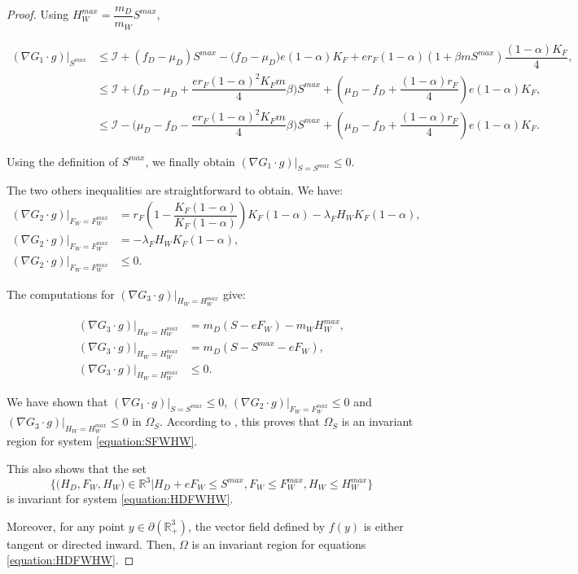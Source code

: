 \documentclass{article}
\newcommand{\lfw}{\lambda_{F}}
\newcommand{\lfw}{\lambda_{F}}
\newcommand{\cI}{\mathcal{I}}
\theoremstyle{definition}
\theoremstyle{remark}
\begin{document}
\begin{proof}
Using $H_W^{max} = \dfrac{m_D}{m_W}S^{max}$,

\begin{align*}
(\nabla G_1 \cdot g)|_{S^{max}} &\leq \cI + (f_D - \mu_D) S^{max} - \Big(f_D - \mu_D \Big) e(1-\alpha)K_F +  er_F (1-\alpha)(1+\beta m S^{max}) \dfrac{(1-\alpha)K_F}{4}, \\
& \leq \cI + \Big(f_D - \mu_D + \dfrac{er_F (1-\alpha)^2K_F m}{4} \beta\Big) S^{max} + \left( \mu_D - f_D   +  \dfrac{(1-\alpha)r_F}{4}\right)e(1-\alpha)K_F, \\
& \leq \cI - \Big(\mu_D -f_D - \dfrac{er_F (1-\alpha)^2K_F m}{4} \beta\Big) S^{max} + \left( \mu_D - f_D   +  \dfrac{(1-\alpha)r_F}{4}\right)e(1-\alpha)K_F.
\end{align*}

Using the definition of $S^{max}$, we finally obtain $(\nabla G_1 \cdot g)|_{S = S^{max}} \leq 0$. 

The two others inequalities are straightforward to obtain. We have:
\begin{align*}
(\nabla G_2 \cdot g)|_{F_W = F_W^{max}} &= r_F  \left(1 - \dfrac{K_F (1-\alpha)}{K_F (1-\alpha)}\right)K_F (1-\alpha)  - \lfw H_W K_F (1-\alpha), \\
(\nabla G_2 \cdot g)|_{F_W = F_W^{max}} & = - \lfw H_W K_F (1-\alpha), \\
(\nabla G_2 \cdot g)|_{F_W = F_W^{max}} & \leq 0.
\end{align*}

The computations for $(\nabla G_3 \cdot g)|_{H_W = H_W^{max}}$ give:

\begin{align*}
(\nabla G_3 \cdot g)|_{H_W = H_W^{max}} &= m_D (S - eF_W) - m_W H_W^{max}, \\
(\nabla G_3 \cdot g)|_{H_W = H_W^{max}} &= m_D (S - S^{max} -  eF_W), \\
(\nabla G_3 \cdot g)|_{H_W = H_W^{max}} & \leq 0.
\end{align*}

We have shown that $(\nabla G_1 \cdot g)|_{S = S^{max}} \leq 0$, $(\nabla G_2 \cdot g)|_{F_W = F_W^{max}} \leq 0$ and $(\nabla G_3 \cdot g)|_{H_W = H_W^{max}} \leq 0$ in  $\Omega_S$.  According to \cite{smoller_shock_1994}, this proves that $\Omega_S$ is an invariant region for system \eqref{equation:SFWHW}.

This also shows that the set  $$\Big\{\Big(H_D, F_W, H_W \Big) \in \mathbb{R}^3  \Big|H_D + eF_W \leq S^{max}, F_W \leq F_W^{max}, H_W \leq H_W^{max} \Big\}$$ is invariant for system \eqref{equation:HDFWHW}. 


Moreover, for any point $y \in \partial (\mathbb{R}_+^3)$, the vector field defined by $f(y)$ is either tangent or directed inward. Then, $\Omega$ is an invariant region for equations \eqref{equation:HDFWHW}. 

\end{proof}
\end{document}
